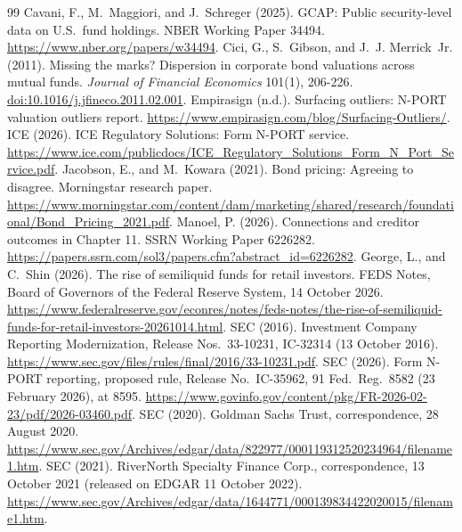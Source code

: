 \documentclass[11pt]{article}
\newcommand{\doi}[1]{\href{https://doi.org/#1}{doi:#1}}
\begin{document}

\begin{thebibliography}{99}
Cavani, F., M.~Maggiori, and J.~Schreger (2025). GCAP: Public security-level data on U.S.\ fund
holdings. NBER Working Paper 34494. \url{https://www.nber.org/papers/w34494}.
Cici, G., S.~Gibson, and J.~J. Merrick~Jr. (2011). Missing the marks? Dispersion in corporate bond
valuations across mutual funds. \emph{Journal of Financial Economics} 101(1), 206-226.
\doi{10.1016/j.jfineco.2011.02.001}.
Empirasign (n.d.). Surfacing outliers: N-PORT valuation outliers report.
\url{https://www.empirasign.com/blog/Surfacing-Outliers/}.
ICE (2026). ICE Regulatory Solutions: Form N-PORT service.
\url{https://www.ice.com/publicdocs/ICE_Regulatory_Solutions_Form_N_Port_Service.pdf}.
Jacobson, E., and M.~Kowara (2021). Bond pricing: Agreeing to disagree. Morningstar research paper.
\url{https://www.morningstar.com/content/dam/marketing/shared/research/foundational/Bond_Pricing_2021.pdf}.
Manoel, P. (2026). Connections and creditor outcomes in Chapter 11. SSRN Working Paper 6226282.
\url{https://papers.ssrn.com/sol3/papers.cfm?abstract_id=6226282}.
George, L., and C.~Shin (2026). The rise of semiliquid funds for retail investors. FEDS Notes, Board of
Governors of the Federal Reserve System, 14 October 2026.
\url{https://www.federalreserve.gov/econres/notes/feds-notes/the-rise-of-semiliquid-funds-for-retail-investors-20261014.html}.
SEC (2016). Investment Company Reporting Modernization, Release Nos.\ 33-10231, IC-32314 (13 October
2016). \url{https://www.sec.gov/files/rules/final/2016/33-10231.pdf}.
SEC (2026). Form N-PORT reporting, proposed rule, Release No.\ IC-35962, 91 Fed.\ Reg.\ 8582 (23 February
2026), at 8595. \url{https://www.govinfo.gov/content/pkg/FR-2026-02-23/pdf/2026-03460.pdf}.
SEC (2020). Goldman Sachs Trust, correspondence, 28 August 2020.
\url{https://www.sec.gov/Archives/edgar/data/822977/000119312520234964/filename1.htm}.
SEC (2021). RiverNorth Specialty Finance Corp., correspondence, 13 October 2021 (released on EDGAR 11 October 2022).
\url{https://www.sec.gov/Archives/edgar/data/1644771/000139834422020015/filename1.htm}.

\end{thebibliography}
\end{document}
